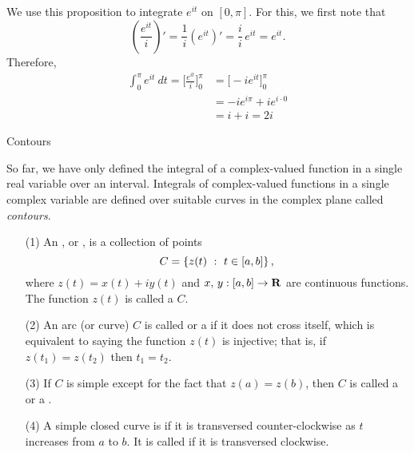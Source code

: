 \begin{example}
We use this proposition to integrate $e^{it}$ on $[0,\pi]$. For this, we first note that
\[\left(\frac{e^{it}}{i}\right)' = \frac{1}{i}\left(e^{it}\right)' = \frac{i}{i}\,e^{it} = e^{it}.\]
Therefore, 
\begin{align*}
\int_0^\pi e^{it}\ dt = \Bigg[\frac{e^{it}}{i}\Bigg]_0^\pi &= \Big[-ie^{it}\Big]_0^\pi\\[0.5em]
&= -ie^{i\pi} + ie^{i\cdot 0}\\[0.5em]
&= i + i = 2i
\end{align*}
\end{example}

\vspace*{2em}

\begin{mdframed}
\begin{center}
{\Large Contours}
\end{center}
\end{mdframed}

So far, we have only defined the integral of a complex-valued function in a single real variable over an interval. Integrals of complex-valued functions in a single complex variable are defined over suitable curves in the complex plane called \emph{contours}.

\vspace*{1em}

\begin{definition}[Arcs]\hfill
\begin{itemize}
\item[(1)] An , or , is a collection of points 
\[C = \left\{z(t)\ :\ t \in [a,b]\right\},\]
where $z(t) = x(t) + iy(t)$ and $x,\,y: [a,b] \to \mathbf R$ are continuous functions. The function $z(t)$ is called a  {\color{blue}$C$}.
\item[(2)] An arc (or curve) $C$ is called  or a  if it does not cross itself, which is equivalent to saying the function $z(t)$ is injective; that is, if $z(t_1) = z(t_2)$ then $t_1 = t_2$. 
\item[(3)] If $C$ is simple except for the fact that $z(a) = z(b)$, then $C$ is called a  or a .
\item[(4)] A simple closed curve is  if it is transversed counter-clockwise as $t$ increases from $a$ to $b$. It is called  if it is transversed clockwise.
\end{itemize}
\end{definition}

